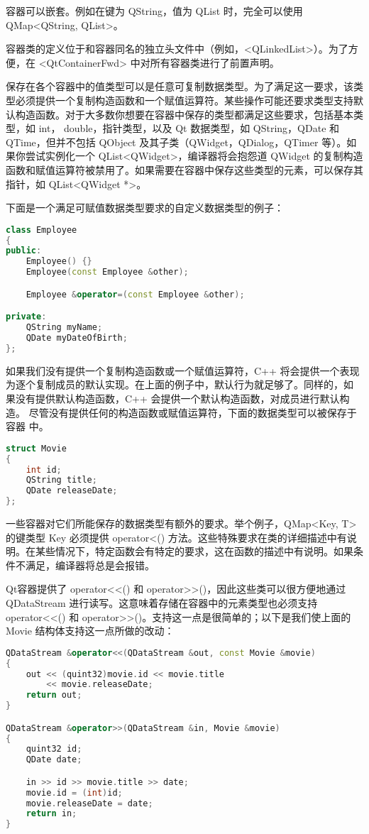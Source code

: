 容器可以嵌套。例如在键为 QString，值为 QList 时，完全可以使用 QMap<QString, QList>。

容器类的定义位于和容器同名的独立头文件中（例如，<QLinkedList>）。为了方便，在 <QtContainerFwd> 中对所有容器类进行了前置声明。

保存在各个容器中的值类型可以是任意可复制数据类型。为了满足这一要求，该类型必须提供一个复制构造函数和一个赋值运算符。某些操作可能还要求类型支持默认构造函数。对于大多数你想要在容器中保存的类型都满足这些要求，包括基本类型，如 int， double，指针类型，以及 Qt 数据类型，如 QString，QDate 和 QTime，但并不包括 QObject 及其子类（QWidget，QDialog，QTimer 等）。如果你尝试实例化一个 QList<QWidget>，编译器将会抱怨道 QWidget 的复制构造函数和赋值运算符被禁用了。如果需要在容器中保存这些类型的元素，可以保存其指针，如 QList<QWidget *>。

下面是一个满足可赋值数据类型要求的自定义数据类型的例子：

\begin{lstlisting}[language=C++]
class Employee
{
public:
    Employee() {}
    Employee(const Employee &other);

    Employee &operator=(const Employee &other);

private:
    QString myName;
    QDate myDateOfBirth;
};
\end{lstlisting}

如果我们没有提供一个复制构造函数或一个赋值运算符，C++ 将会提供一个表现
为逐个复制成员的默认实现。在上面的例子中，默认行为就足够了。同样的，如
果没有提供默认构造函数，C++ 会提供一个默认构造函数，对成员进行默认构造。
尽管没有提供任何的构造函数或赋值运算符，下面的数据类型可以被保存于容器
中。

\begin{lstlisting}[language=C++]
struct Movie
{
    int id;
    QString title;
    QDate releaseDate;
};
\end{lstlisting}

一些容器对它们所能保存的数据类型有额外的要求。举个例子，QMap<Key, T> 的键类型 Key 必须提供 operator<() 方法。这些特殊要求在类的详细描述中有说明。在某些情况下，特定函数会有特定的要求，这在函数的描述中有说明。如果条件不满足，编译器将总是会报错。

Qt容器提供了 operator<<() 和 operator>>()，因此这些类可以很方便地通过
QDataStream 进行读写。这意味着存储在容器中的元素类型也必须支持
operator<<() 和 operator>>()。支持这一点是很简单的；以下是我们使上面的
Movie 结构体支持这一点所做的改动：

\begin{lstlisting}[language=C++]
QDataStream &operator<<(QDataStream &out, const Movie &movie)
{
    out << (quint32)movie.id << movie.title
        << movie.releaseDate;
    return out;
}

QDataStream &operator>>(QDataStream &in, Movie &movie)
{
    quint32 id;
    QDate date;

    in >> id >> movie.title >> date;
    movie.id = (int)id;
    movie.releaseDate = date;
    return in;
}
\end{lstlisting}

